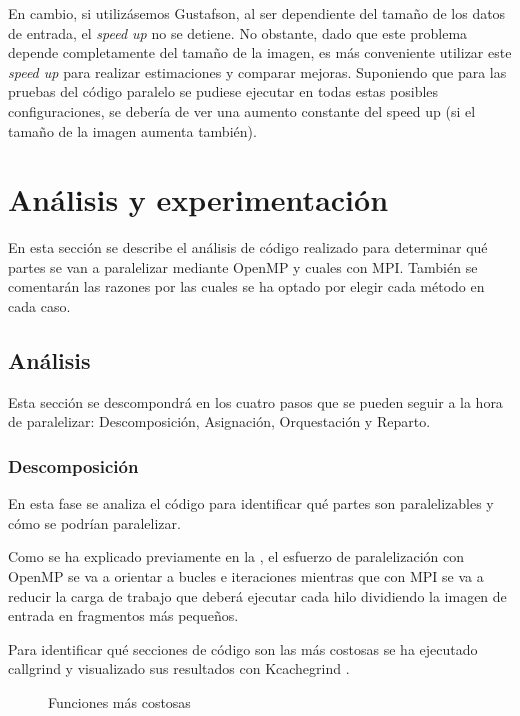 \documentclass[12pt]{report} %
\begin{document}
En cambio, si utilizásemos Gustafson, al ser dependiente del tamaño de los datos de entrada, el
\textit{speed up} no se detiene. No obstante, dado que este problema depende completamente del tamaño
de la imagen, es más conveniente utilizar este \textit{speed up} para realizar estimaciones y comparar
mejoras. Suponiendo que para las pruebas del código paralelo se pudiese ejecutar en todas estas posibles
configuraciones, se debería de ver una aumento constante del speed up (si el tamaño de la imagen aumenta
también).


\chapter{Análisis y experimentación}

En esta sección se describe el análisis de código realizado para determinar qué partes se van a
paralelizar mediante OpenMP y cuales con MPI. También se comentarán las razones por las cuales se ha optado
por elegir cada método en cada caso.

\section{Análisis}

Esta sección se descompondrá en los cuatro pasos que se pueden seguir a la hora de paralelizar:
Descomposición, Asignación, Orquestación y Reparto.

\subsection{Descomposición}

En esta fase se analiza el código para identificar qué partes son paralelizables y cómo se podrían paralelizar.

Como se ha explicado previamente en la , el esfuerzo de paralelización con OpenMP se va
a orientar a bucles e iteraciones mientras que con MPI se va a reducir la carga de trabajo que deberá ejecutar
cada hilo dividiendo la imagen de entrada en fragmentos más pequeños.

Para identificar qué secciones de código son las más costosas se ha ejecutado callgrind y visualizado sus
resultados con Kcachegrind \parencite{weidendorfer_kcachegrind_2013}. 

\begin{figure}[H]
    \caption{Funciones más costosas}
    \label{fig:kcachegrind}
\end{figure}
\end{document}
